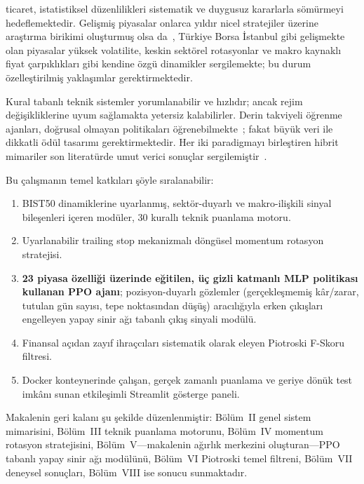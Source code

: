 \documentclass[journal]{IEEEtran}
\begin{document}
 ticaret, istatistiksel düzenlilikleri
sistematik ve duygusuz kararlarla sömürmeyi hedeflemektedir.
Gelişmiş piyasalar onlarca yıldır nicel stratejiler üzerine
araştırma birikimi oluşturmuş olsa da~\cite{chan2008}, Türkiye
Borsa İstanbul gibi gelişmekte olan piyasalar yüksek volatilite,
keskin sektörel rotasyonlar ve makro kaynaklı fiyat çarpıklıkları
gibi kendine özgü dinamikler sergilemekte; bu durum özelleştirilmiş
yaklaşımlar gerektirmektedir.

Kural tabanlı teknik sistemler yorumlanabilir ve hızlıdır; ancak
rejim değişikliklerine uyum sağlamakta yetersiz kalabilirler.
Derin takviyeli öğrenme ajanları, doğrusal olmayan politikaları
öğrenebilmekte~\cite{mnih2015}; fakat büyük veri ile dikkatli ödül
tasarımı gerektirmektedir. Her iki paradigmayı birleştiren hibrit
mimariler son literatürde umut verici sonuçlar
sergilemiştir~\cite{liu2021, carta2021}.

Bu çalışmanın temel katkıları şöyle sıralanabilir:
\begin{enumerate}
\item BIST50 dinamiklerine uyarlanmış, sektör-duyarlı ve
      makro-ilişkili sinyal bileşenleri içeren modüler, 30 kurallı
      teknik puanlama motoru.
\item Uyarlanabilir trailing stop mekanizmalı döngüsel momentum
      rotasyon stratejisi.
\item \textbf{23 piyasa özelliği üzerinde eğitilen, üç gizli katmanlı
      MLP politikası kullanan PPO ajanı}; pozisyon-duyarlı gözlemler
      (gerçekleşmemiş kâr/zarar, tutulan gün sayısı, tepe noktasından
      düşüş) aracılığıyla erken çıkışları engelleyen yapay sinir ağı
      tabanlı çıkış sinyali modülü.
\item Finansal açıdan zayıf ihraçcıları sistematik olarak eleyen
      Piotroski F-Skoru filtresi.
\item Docker konteynerinde çalışan, gerçek zamanlı puanlama ve geriye
      dönük test imkânı sunan etkileşimli Streamlit gösterge paneli.
\end{enumerate}

Makalenin geri kalanı şu şekilde düzenlenmiştir: Bölüm~II genel
sistem mimarisini, Bölüm~III teknik puanlama motorunu, Bölüm~IV
momentum rotasyon stratejisini, Bölüm~V—makalenin ağırlık merkezini
oluşturan—PPO tabanlı yapay sinir ağı modülünü, Bölüm~VI Piotroski
temel filtreni, Bölüm~VII deneysel sonuçları, Bölüm~VIII ise
sonucu sunmaktadır.

\end{document}
